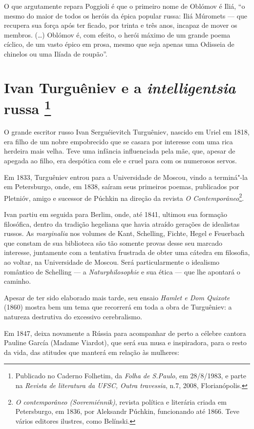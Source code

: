 O que argutamente repara Poggioli é que o primeiro nome de Oblómov é Iliá, ``o mesmo do maior de todos os heróis da épica popular russa: Iliá Múromets --- que recupera sua força após ter ficado, por trinta e três anos, incapaz de mover os membros. (\ldots{}) Oblómov é, com efeito, o herói máximo de um grande poema cíclico, de um vasto épico em prosa, mesmo que seja apenas uma Odisseia de chinelos ou uma Ilíada de roupão''.

\chapter{Ivan Turguêniev e a \emph{intelligentsia} russa \footnote{Publicado no Caderno Folhetim, da \emph{Folha de S.Paulo}, em 28/8/1983, e parte na \emph{Revista de literatura da UFSC, Outra travessia}, n.7, 2008, Florianópolis.}}

O grande escritor russo Ivan Serguéievitch Turguêniev, nascido
em Uriel em 1818, era filho de um nobre empobrecido que se casara
por interesse com uma rica
herdeira mais velha. Teve uma infância influenciada pela mãe, que,
apesar de apegada ao filho, era despótica com ele e cruel para com os numerosos servos.

Em 1833, Turguêniev entrou para a Universidade de Moscou, vindo a terminá"-la em
Petersburgo, onde, em 1838, saíram seus primeiros poemas, publicados por
Pletnióv, amigo e sucessor de Púchkin na direção da revista \emph{O
Contemporâneo}\footnote{\emph{O contemporâneo (Sovremiénnik)}, revista política e literária criada em Petersburgo, em 1836, por Aleksandr Púchkin, funcionando até 1866. Teve vários editores ilustres, como Belínski.}.

Ivan partiu em seguida para Berlim, onde, até 1841, ultimou sua formação
filosófica, dentro da tradição hegeliana que havia atraído gerações de
idealistas russos. As \emph{marginalia} nos volumes de Kant, Schelling,
Fichte, Hegel e Feuerbach que constam de sua biblioteca são tão somente
provas desse seu marcado interesse, juntamente com a tentativa frustrada
de obter uma cátedra em filosofia, ao voltar, na Universidade de
Moscou. Será particularmente o idealismo romântico de Schelling --- a
\emph{Naturphilosophie} e sua ética --- que lhe apontará o caminho.

Apesar de ter sido elaborado mais tarde, seu ensaio \emph{Hamlet e Dom
Quixote} (1860) mostra bem um tema que recorrerá em toda a  obra
de Turguêniev: a natureza destrutiva do excessivo cerebralismo.

Em 1847, deixa novamente a Rússia para acompanhar de perto a célebre
cantora Pauline García (Madame Viardot), que será sua musa e inspiradora, para o
resto da vida, das atitudes que manterá em relação às mulheres:

